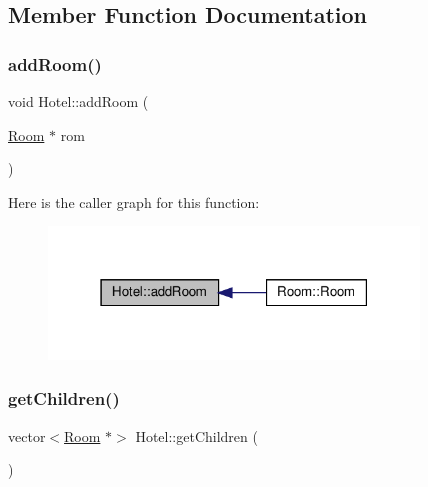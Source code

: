 \subsection{Member Function Documentation}
\mbox{\label{class_hotel_a81dd1c4ed4589770fad50517688035a1}} 
\subsubsection{\texorpdfstring{add\+Room()}{addRoom()}}
{\footnotesize\ttfamily void Hotel\+::add\+Room (\begin{DoxyParamCaption}\item[{\hyperlink{class_room}{Room} $\ast$}]{rom }\end{DoxyParamCaption})\hspace{0.3cm}{\ttfamily [inline]}}

Here is the caller graph for this function\+:\nopagebreak
\begin{figure}[H]
\begin{center}
\leavevmode
\includegraphics[width=279pt]{class_hotel_a81dd1c4ed4589770fad50517688035a1_icgraph}
\end{center}
\end{figure}
\mbox{\label{class_hotel_a1e22ca2270cf28ea4b03497701d970a1}} 
\subsubsection{\texorpdfstring{get\+Children()}{getChildren()}}
{\footnotesize\ttfamily vector$<$\hyperlink{class_room}{Room} $\ast$$>$ Hotel\+::get\+Children (\begin{DoxyParamCaption}{ }\end{DoxyParamCaption})\hspace{0.3cm}{\ttfamily [inline]}}

\mbox{\label{class_hotel_a10b09b0e1309de50bc7cc6ebafb822af}} 
